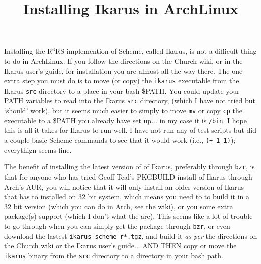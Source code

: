 \documentclass{wpblogentry}
\title{Installing Ikarus in ArchLinux}
\begin{document}
Installing the R$^6$RS implemention of Scheme, called Ikarus, is not a difficult thing to do in ArchLinux. If you follow the directions on the Church wiki, or in the Ikarus user's guide, for installation you are almost all the way there. The one extra step you must do is to move (or copy) the \verb=ikarus= executable from the Ikarus \verb=src= directory to a place in your bash \$PATH. You could update your PATH variables to read into the Ikarus \verb=src= directory, (which I have not tried but `should' work), but it seems much easier to simply to move \verb=mv= or copy \verb=cp= the executable to a \$PATH you already have set up... in my case it is \verb=/bin=. I hope this is all it takes for Ikarus to run well. I have not run any of test scripts but did a couple basic Scheme commands to see that it would work (i.e., \verb=(+ 1 1)=); everythign seems fine. 

The benefit of installing the latest version of of Ikarus, preferably through \verb=bzr=, is that for anyone who has tried Geoff Teal's PKGBUILD install of Ikarus through Arch's AUR, you will notice that it will only install an older version of Ikarus that has to installed on 32 bit system, which means you need to to build it in a 32 bit version (which you can do in Arch, see the wiki), or you some extra package(s) support (which I don't what the are). This seems like a lot of trouble to go through when you can simply get the package through \verb=bzr=, or even download the lastest \verb=ikarus-scheme-r*.tgz=, and build it \emph{as per} the directions on the Church wiki or the Ikarus user's guide... AND THEN copy or move the \verb=ikarus= binary from the \verb=src= directory to a directory in your bash path.
\end{document}
